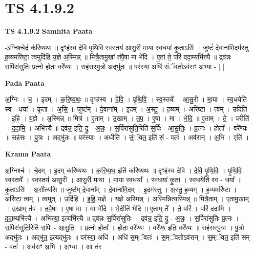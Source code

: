 \documentclass[17pt]{extarticle}
\begin{document}
\section{ TS 4.1.9.2 }

\textbf{TS 4.1.9.2 } \newline
\textbf{Samhita Paata} \newline

-ऽग्निश्चे॒दं क॑रिष्यथः ॥ दृꣳह॑स्व देवि पृथिवि स्व॒स्तय॑ आसु॒री मा॒या स्व॒धया॑ कृ॒ताऽसि॑ । जुष्टं॑ दे॒वाना॑मि॒दम॑स्तु ह॒व्यमरि॑ष्टा॒ त्वमुदि॑हि य॒ज्ञे अ॒स्मिन्न् ॥ मित्रै॒तामु॒खां त॑पै॒षा मा भे॑दि । ए॒तां ते॒ परि॑ ददा॒म्यभि॑त्त्यै ॥ द्र्व॑न्नः स॒र्पिरा॑सुतिः प्र॒त्नो होता॒ वरे᳚ण्यः । सह॑सस्पु॒त्रो अद्भु॑तः ॥ पर॑स्या॒ अधि॑ सं॒ॅवतोऽव॑राꣳ अ॒भ्या - [  ] \newline

\textbf{Pada Paata} \newline

अ॒ग्निः । च॒ । इ॒दम् । क॒रि॒ष्य॒थः॒ ॥ दृꣳह॑स्व । दे॒वि॒ । पृ॒थि॒वि॒ । स्व॒स्तये᳚ । आ॒सु॒री । मा॒या । स्व॒धयेति॑ स्व - धया᳚ । कृ॒ता । अ॒सि॒ ॥ जुष्ट᳚म् । दे॒वाना᳚म् । इ॒दम् । अ॒स्तु॒ । ह॒व्यम् । अरि॑ष्टा । त्वम् । उदिति॑ । इ॒हि॒ । य॒ज्ञे । अ॒स्मिन्न् ॥ मित्र॑ । ए॒ताम् । उ॒खाम् । त॒प॒ । ए॒षा । मा । भे॒दि॒ ॥ ए॒ताम् । ते॒ । परीति॑ । द॒दा॒मि॒ । अभि॑त्त्यै ॥ द्र्‌व॑न्न॒ इति॒ द्रु - अ॒न्नः॒ । स॒र्पिरा॑सुति॒रिति॑ स॒र्पिः - आ॒सु॒तिः॒ । प्र॒त्नः । होता᳚ । वरे᳚ण्यः ॥ सह॑सः । पु॒त्रः । अद्भु॑तः ॥ पर॑स्याः । अधीति॑ । सं॒ॅवत॒ इति॑ सं - वतः॑ । अव॑रान् । अ॒भि । एति॑ ।  \newline


\textbf{Krama Paata} \newline

अ॒ग्निश्च॑ । चे॒दम् । इ॒दम् क॑रिष्यथः । क॒रि॒ष्य॒थ॒ इति॑ करिष्यथः ॥ दृꣳह॑स्व देवि । दे॒वि॒ पृ॒थि॒वि॒ । पृ॒थि॒वि॒ स्व॒स्तये᳚ । स्व॒स्तय॑ आसु॒री । आ॒सु॒री मा॒या । मा॒या स्व॒धया᳚ । स्व॒धया॑ कृ॒ता । स्व॒धयेति॑ स्व - धया᳚ । कृ॒ताऽसि॑ । अ॒सीत्य॑सि ॥ जुष्ट॑म् दे॒वाना᳚म् । दे॒वाना॑मि॒दम् । इ॒दम॑स्तु । अ॒स्तु॒ ह॒व्यम् । ह॒व्यमरि॑ष्टा । अरि॑ष्टा॒ त्वम् । त्वमुत् । उदि॑हि । इ॒हि॒ य॒ज्ञे । य॒ज्ञे अ॒स्मिन्न् । अ॒स्मिन्नित्य॒स्मिन्न् ॥ मित्रै॒ताम् । ए॒तामु॒खाम् । उ॒खाम् त॑प । त॒पै॒षा । ए॒षा मा । मा भे॑दि । भे॒दीति॑ भेदि ॥ ए॒ताम् ते᳚ । ते॒ परि॑ । परि॑ ददामि । द॒दा॒म्यभि॑त्त्यै । अभि॑त्त्या॒ इत्यभि॑त्त्यै ॥ द्र्व॑न्नः स॒र्पिरा॑सुतिः । द्र्व॑न्न॒ इति॒ द्रु - अ॒न्नः॒ । स॒र्पिरा॑सुतिः प्र॒त्नः । स॒र्पिरा॑सुति॒रिति॑ स॒र्पिः - आ॒सु॒तिः॒ । प्र॒त्नो होता᳚ । होता॒ वरे᳚ण्यः । वरे᳚ण्य॒ इति॒ वरे᳚ण्यः ॥ सह॑सस्पु॒त्रः । पु॒त्रो अद्भु॑तः । अद्भु॑त॒ इत्यद्भु॑तः ॥ पर॑स्या॒ अधि॑ । अधि॑ स॒म्ॅवतः॑ । स॒म्ॅवतोऽव॑रान् । स॒म्ॅवत॒ इति॑ सम् - वतः॑ । अव॑राꣳ अ॒भि । अ॒भ्या । आ त॑र \newline
\end{document}
